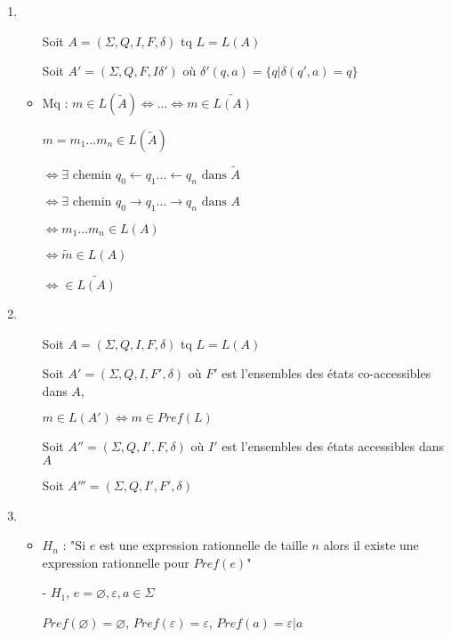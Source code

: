 \documentclass{article}
\newcommand{\image}[3]{ %
    \begin{minipage}[t]{\linewidth}
        #1
              \adjustbox{valign=t}{%
                \texttt{[image: \#3]}%
              }
    \end{minipage}}
\begin{document}
\begin{enumerate}
    \item \begin{itemize}
        \item[] Soit $A = (\Sigma, Q, I, F, \delta)$ tq $L = L(A)$
        \item[] Soit $A' = (\Sigma, Q, F, I \delta')$ où $\delta'(q, a) = \{ q |  \delta(q', a) = q \}$
        \item[] \image{}{0.2}{img/II-1.jpeg}
        \item Mq : $m \in L(\tilde A) \Leftrightarrow ... \Leftrightarrow m \in \widetilde{L(A)}$
        \item[] $m = m_1...m_n \in L(\tilde A)$
        \item[] $\Leftrightarrow \exists \text{ chemin } q_0 \leftarrow q_1 ... \leftarrow q_n \text{ dans } \tilde A$
        \item[] $\Leftrightarrow \exists \text{ chemin } q_0 \rightarrow q_1 ... \rightarrow q_n \text{ dans } A$
        \item[] $\Leftrightarrow m_1...m_n \in L(A)$
        \item[] $\Leftrightarrow \tilde m \in L(A)$
        \item[] $\Leftrightarrow \in \widetilde{L(A)}$
    \end{itemize}
    \item \begin{itemize}
        \item[] Soit $A = (\Sigma, Q, I, F, \delta)$ tq $L = L(A)$
        \item[] Soit $A' = (\Sigma, Q, I, F', \delta)$ où $F'$ est l'ensembles des états co-accessibles dans $A$,
        \item[] $m \in L(A') \Leftrightarrow m \in Pref(L)$
        \item[] Soit $A'' = (\Sigma, Q, I', F, \delta)$ où $I'$ est l'ensembles des états accessibles dans $A$
        \item[] Soit $A''' = (\Sigma, Q, I', F', \delta)$
    \end{itemize}
    \item \begin{itemize}
        \item $H_n$ : "Si $e$ est une expression rationnelle de taille $n$ alors il existe une expression rationnelle pour $Pref(e)$"
        \item[-] $H_1$, $e = \varnothing, \varepsilon, a \in \Sigma$
        \item[] $Pref(\varnothing) = \varnothing$, $Pref(\varepsilon) = \varepsilon$, $Pref(a) = \varepsilon|a$

\end{itemize}
\end{enumerate}
\end{document}
